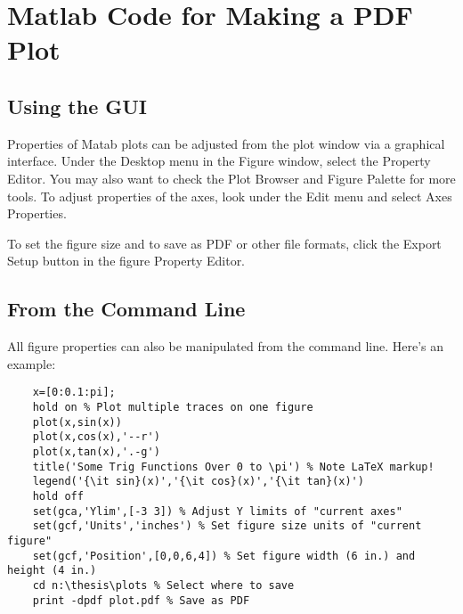\chapter[PDF Plots From Matlab]{Matlab Code for Making a PDF Plot}
\label{AppendixA}

\section{Using the GUI}
Properties of Matab plots can be adjusted from the plot window via a graphical interface. Under the Desktop menu in the Figure window, select the Property Editor. You may also want to check the Plot Browser and Figure Palette for more tools. To adjust properties of the axes, look under the Edit menu and select Axes Properties.

To set the figure size and to save as PDF or other file formats, click the Export Setup button in the figure Property Editor.

\section{From the Command Line} 
All figure properties can also be manipulated from the command line. Here's an example: 

\begin{verbatim}
	x=[0:0.1:pi];
	hold on % Plot multiple traces on one figure
	plot(x,sin(x))
	plot(x,cos(x),'--r')
	plot(x,tan(x),'.-g')
	title('Some Trig Functions Over 0 to \pi') % Note LaTeX markup!
	legend('{\it sin}(x)','{\it cos}(x)','{\it tan}(x)')
	hold off
	set(gca,'Ylim',[-3 3]) % Adjust Y limits of "current axes"
	set(gcf,'Units','inches') % Set figure size units of "current figure"
	set(gcf,'Position',[0,0,6,4]) % Set figure width (6 in.) and height (4 in.)
	cd n:\thesis\plots % Select where to save
	print -dpdf plot.pdf % Save as PDF
\end{verbatim}
